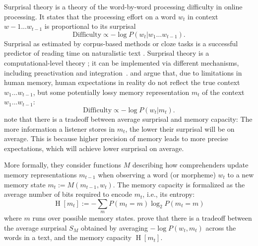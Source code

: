 \documentclass[11pt,letterpaper]{article}
\newcommand{\citep}{\parencite}
\newcommand{\citet}{\Textcite}
\newcommand\mhahn[1]{{\color{red}(#1)}}
\begin{document}
Surprisal theory \citep{hale2001probabilistic, levy2008expectation} is a theory of the word-by-word processing difficulty in online processing.
It states that the processing effort on a word $w_t$ in context $w-1 ... w_{t-1}$ is proportional to its surprisal
     \begin{equation}   \label{eq:true-surp}
    \text{Difficulty} \propto -\log P(w_t | w_1\dots w_{t-1}).
\end{equation}
Surprisal as estimated by corpus-based methods or cloze tasks is a successful predictor of reading time on naturalistic text \citep{smith2013effect,goodkind-predictive-2018,frank2019interaction,aurnhammer2019evaluating,wilcox2020predictive}. %
Surprisal theory is a computational-level theory \citep{marr-vision}; it can be implemented via different mechanisms, including preactivation and integration~\citep{kuperberg2016we}. 
\citet{futrell-noisy-context-2017-1} and \citet{Hahn2020modeling} argue that, due to limitations in human memory, human expectations in reality do not reflect the true context $w_1\dots w_{t-1}$, but some potentially lossy memory representation $m_t$ of the context $w_1\dots w_{t-1}$:
\begin{equation}   \label{eq:lossy-surp}
    \text{Difficulty} \propto -\log P(w_t | m_t).
\end{equation}
\citet{Hahn2020modeling} note that there is a tradeoff between average surprisal and memory capacity:
The more information a listener stores in $m_t$, the lower their surprisal will be on average.
This is because higher precision of memory leads to more precise expectations, which will achieve lower surprisal on average.

More formally, they consider functions $M$ describing how comprehenders update memory representations $m_{t-1}$ when observing a word (or morpheme) $w_t$ to a new memory state $m_t := M(m_{t-1}, w_t)$.
The memory capacity is formalized as the average number of bits required to encode $m_t$, i.e., its entropy:
\begin{equation*}
    \operatorname{H}[m_t] := - \sum_m P(m_t = m) \log_2 P(m_t=m)
\end{equation*}
where $m$ runs over possible memory states.
\citet{Hahn2020modeling} prove that there is a tradeoff between the average surprisal $S_M$ obtained by averaging $- \log P(w_t , m_t)$ across the words in a text, and the memory capacity $\operatorname{H}[m_t]$.

\end{document}
